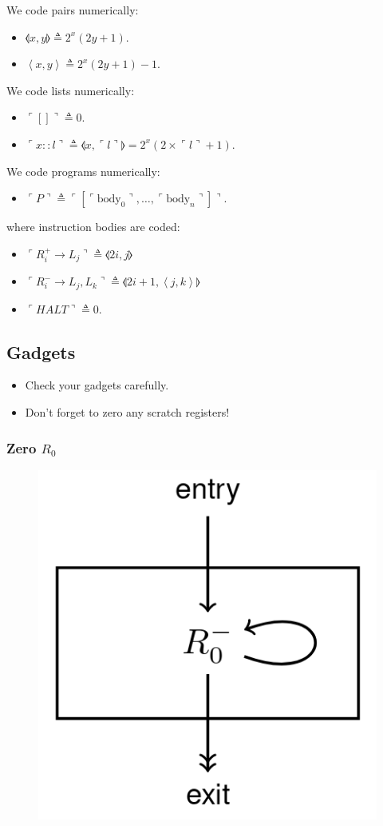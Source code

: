 \documentclass[twocolumn,english]{article}
\begin{document}
We code pairs numerically: 
\begin{itemize}
\item $\llangle x,y\rrangle\triangleq2^{x}\left(2y+1\right)$. 
\item $\left\langle x,y\right\rangle \triangleq2^{x}\left(2y+1\right)-1$. 
\end{itemize}
We code lists numerically: 
\begin{itemize}
\item $\ulcorner[]\urcorner\triangleq0$. 
\item $\ulcorner x::l\urcorner\triangleq\llangle x,\ulcorner l\urcorner\rrangle=2^{x}\left(2\times\ulcorner l\urcorner+1\right)$. 
\end{itemize}
We code programs numerically: 
\begin{itemize}
\item $\ulcorner P\urcorner\triangleq\ulcorner\left[\ulcorner\text{body}_{0}\urcorner,\dots,\ulcorner\text{body}_{n}\urcorner\right]\urcorner$. 
\end{itemize}
where instruction bodies are coded: 
\begin{itemize}
\item $\ulcorner R_{i}^{+}\rightarrow L_{j}\urcorner\triangleq\llangle2i,j\rrangle$ 
\item $\ulcorner R_{i}^{-}\rightarrow L_{j},L_{k}\urcorner\triangleq\llangle2i+1,\left\langle j,k\right\rangle \rrangle$ 
\item $\ulcorner HALT\urcorner\triangleq0$. 
\end{itemize}

\subsection{Gadgets}
\begin{itemize}
\item Check your gadgets carefully.
\item Don't forget to zero any scratch registers!
\end{itemize}

\subsubsection*{Zero $R_{0}$}

\begin{figure}[H]
\centering{}\includegraphics[width=0.3\columnwidth]{img/zero} 
\end{figure}
\end{document}

